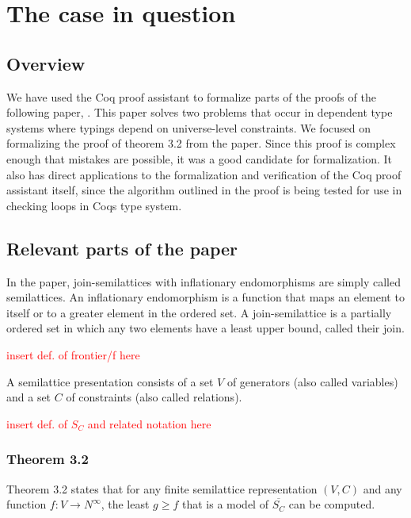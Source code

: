 \chapter{The case in question}

\section{Overview}

We have used the Coq proof assistant to formalize parts of the proofs of the following paper, \citeauthor{mbezem} \cite{mbezem}.
This paper solves two problems that occur in dependent type systems where typings depend
on universe-level constraints. We focused on formalizing the proof of theorem 3.2 from the paper.
Since this proof is complex enough that mistakes are possible, it was a good candidate for formalization.
It also has direct applications to the formalization and verification of the Coq proof assistant itself,
since the algorithm outlined in the proof is being tested
for use in checking loops in Coqs type system. \cite{coqgithub}

\section{Relevant parts of the paper}

In the paper, join-semilattices with inflationary endomorphisms
are simply called semilattices. An inflationary endomorphism is a function
that maps an element to itself or to a greater element in the ordered set.
A join-semilattice is a partially ordered set in which any two elements have a least upper bound,
called their join.

\textcolor{red}{insert def. of frontier/f here}

A semilattice presentation consists of a set $V$ of generators
(also called variables) and a set  $C$ of constraints
(also called relations).

\textcolor{red}{insert def. of $S_C$ and related notation here}


\subsection{Theorem 3.2}

Theorem 3.2 states that for any finite semilattice representation
$(V, C)$ and any function $f : V \rightarrow N^{\infty}$,
the least $g \ge f$ that is a model of $\overline{S_C}$ can be computed.

